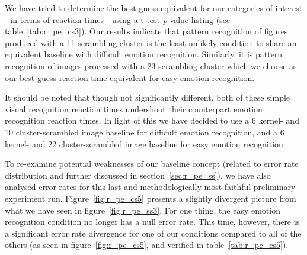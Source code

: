 	    We have tried to determine the best-guess equivalent for our categories of interest - in terms of reaction times - using a t-test \textit{p}-value listing (see table~\ref{tab:r_pe_cs3}).
	    Our results indicate that pattern recognition of figures produced with a \SI{11}{\pixel} scrambling cluster is the least unlikely condition to share an equivalent baseline with difficult emotion recognition.
	    Similarly, it is pattern recognition of images processed with a \SI{23}{\pixel} scrambling cluster which we choose as our best-guess reaction time equivalent for easy emotion recognition.
	    
	    It should be noted that though not significantly different, both of these simple visual recognition reaction times undershoot their counterpart emotion recognition reaction times.
	    In light of this we have decided to use a \SI{6}{\pixel} kernel- and \SI{10}{\pixel} cluster-scrambled image baseline for difficult emotion recognition, 
	    and a \SI{6}{\pixel} kernel- and \SI{22}{\pixel} cluster-scrambled image baseline for easy emotion recognition.
	    
	    
	    To re-examine potential weaknesses of our baseline concept (related to error rate distribution and further discussed in section~\ref{sec:r_pe_ss}), we have also analysed error rates for this last and methodologically most faithful preliminary experiment run.
	    Figure~\ref{fig:r_pe_cs5} presents a slightly divergent picture from what we have seen in figure~\ref{fig:r_pe_ss3}.
	    For one thing, the easy emotion recognition condition no longer has a null error rate.
	    This time, however, there is a significant error rate divergence for one of our conditions compared to all of the others (as seen in figure~\ref{fig:r_pe_cs5}, and verified in table~\ref{tab:r_pe_cs5}).
	
